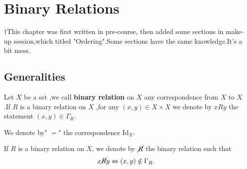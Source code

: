 \documentclass{book}
\numberwithin{equation}{section}
\begin{document}
\chapter{Binary Relations }
$\dagger$This chapter was first written in pre-course, then added some sections in make-up session,which titled "Ordering".Some sections have the same knowledge.It's a bit mess.
\section{Generalities}
\begin{definitionenv}
    Let $X$ be a set ,we call \textbf{binary relation} on $X$ any correspondence from $X$ to $X$ .If $R$ is a binary relation on $X$ ,for any $(x,y)\in X\times X $ we denote by $x R y $ the statement $(x,y)\in \Gamma_R$.
\end{definitionenv}
\begin{exampleenv}
    We denote by" $=$" the correspondence $\mathrm{Id}_X$.
\end{exampleenv}
\begin{definitionenv}
    If $R$ is a binary relation on $X$, we denote by $\cancel{R} $ the binary relation such that $$x \cancel{R}  y \Leftrightarrow (x,y)\notin \Gamma_R.$$
\end{definitionenv}
\end{document}
